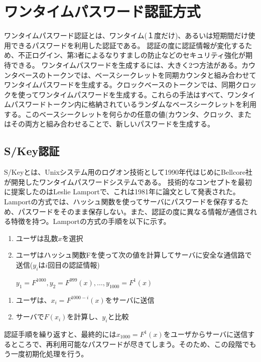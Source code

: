 \documentclass{thesis}
\begin{document}
\section{ワンタイムパスワード認証方式}
ワンタイムパスワード認証\cite{認証技術}とは、ワンタイム(１度だけ)、あるいは短期間だけ使用できるパスワードを利用した認証である。
認証の度に認証情報が変化するため、不正ログイン、第3者によるなりすましの防止などのセキュリティ強化が期待できる。
ワンタイムパスワードを生成するには、大きく2つ方法がある。カウンタベースのトークンでは、ベースシークレットを同期カウンタと組み合わせてワンタイムパスワードを生成する。クロックベースのトークンでは、同期クロックを使ってワンタイムパスワードを生成する。これらの手法はすべて、ワンタイムパスワードトークン内に格納されているランダムなベースシークレットを利用する。このベースシークレットを何らかの任意の値(カウンタ、クロック、またはその両方と組み合わせることで、新しいパスワードを生成する。


\subsection{S/Key認証}
S/Key\cite{s/key}とは、Unixシステム用のログオン技術として1990年代はじめにBellcore社が開発したワンタイムパスワードシステムである。
技術的なコンセプトを最初に提案したのはLeslie Lamportで、これは1981年に論文\cite{Lamport}として発表された。
Lamportの方式では、ハッシュ関数を使ってサーバにパスワードを保存するため、パスワードをそのまま保存しない。また、認証の度に異なる情報が通信される特徴を持つ。Lamportの方式の手順を以下に示す。

\begin{enumerate}[・]
\item ユーザは乱数$x$を選択
\item ユーザはハッシュ関数Fを使って次の値を計算してサーバに安全な通信路で送信($y_i$は$i$回目の認証情報)

$y_{1} = F^{1000},y_{2} = F^{999}(x),…,y_{1000} = F^1(x)$
\end{enumerate}
\begin{enumerate}[・]
\item ユーザは、$x_i = F^{1000-i}(x)$をサーバに送信
\item サーバで$F(x_i)$を計算し、$y_i$と比較
\end{enumerate}
認証手順を繰り返すと、最終的には$x_{1000} = F^1(x)$をユーザからサーバに送信するところで、再利用可能なパスワードが尽きてしまう。そのため、この段階でもう一度初期化処理を行う。
\end{document}
